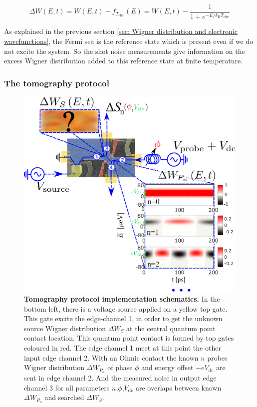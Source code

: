 \begin{equation}
\Delta W\left(E,t\right) = W\left(E,t\right) - f_{T_{\mathrm{elec}}}\left(E\right) = W\left(E,t\right) - \frac{1}{1+e^{-E/k_{\mathrm{B}}T_{\mathrm{elec}}}} \label{eq: excess Wigner at finite temp}
\end{equation}

As explained in the previous section \ref{sec: Wigner distribution and electronic wavefunctions}, the Fermi sea is the reference state which is present even if we do not excite the system.
So the shot noise measurements give information on the excess Wigner distribution added to this reference state at finite temperature.

\subsubsection*{The tomography protocol}

\begin{figure}[hpbt]
	\centering
	\includegraphics[width = 13cm]{./chap1/figure_principe_tomo.eps}
	\caption{\textbf{Tomography protocol implementation schematics.} In the bottom left, there is a voltage source applied on a yellow top gate. This gate excite the edge-channel 1, in order to get the unknown source Wigner distribution $\Delta W_{S}$ at the central quantum point contact location. This quantum point contact is formed by top gates coloured in red. The edge channel 1 meet at this point the other input edge channel 2. With an Ohmic contact the known $n$ probes Wigner distribution $\Delta W_{P_{n}}$ of phase $\phi$ and energy offset $-eV_{\mathrm{dc}}$ are sent in edge channel 2. And the measured noise in output edge channel 3 for all parameters $n$,$\phi$,$V_{\mathrm{dc}}$ are overlaps between known $\Delta W_{P_{n}}$ and searched $\Delta W_{S}$.}
	\label{fig: principe de la tomographie}
\end{figure}

